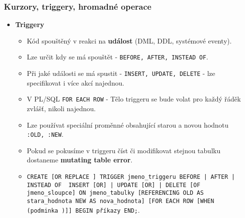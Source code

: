 \subsubsection{Kurzory, triggery, hromadné operace}
\begin{itemize}
\item\textbf{Triggery}
\begin{itemize}
\item Kód spouštěný v reakci na \textbf{událost} (DML, DDL, systémové eventy).
\item Lze určit kdy se má spouštět - \texttt{BEFORE, AFTER, INSTEAD OF}.
\item Při jaké události se má spustit - \texttt{INSERT, UPDATE, DELETE} - lze specifikovat i více akcí najednou.
\item V PL/SQL \texttt{FOR EACH ROW} - Tělo triggeru se bude volat pro každý řáděk zvlášť, nikoli najednou.
\item Lze používat speciální proměnné obsahující starou a novou hodnotu \texttt{:OLD, :NEW}.
\item Pokud se pokusíme v triggeru číst či modifikovat stejnou tabulku dostaneme \textbf{mutating table error}.
\item \texttt{CREATE [OR REPLACE ] TRIGGER jmeno\_triggeru {BEFORE | AFTER | INSTEAD OF } {INSERT [OR] | UPDATE [OR] | DELETE} [OF jmeno\_sloupce] ON jmeno\_tabulky [REFERENCING OLD AS stara\_hodnota NEW AS nova\_hodnota] [FOR EACH ROW [WHEN (podminka )]] BEGIN příkazy END;}.
\end{itemize}
\end{itemize}



